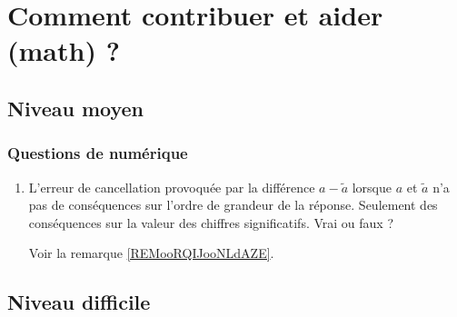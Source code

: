 \section{Comment contribuer et aider (math) ?}

\subsection{Niveau moyen}

\subsubsection{Questions de numérique}

\begin{enumerate}
    \item
        L'erreur de cancellation provoquée par la différence \( a-\tilde a\) lorsque \( a\) et \( \tilde a\) n'a pas de conséquences sur l'ordre de grandeur de la réponse. Seulement des conséquences sur la valeur des chiffres significatifs. Vrai ou faux ?

        Voir la remarque \ref{REMooRQIJooNLdAZE}.
\end{enumerate}

\subsection{Niveau difficile}


